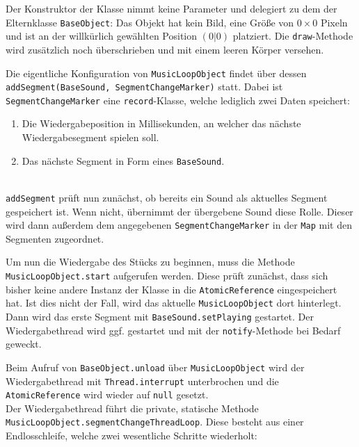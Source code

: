 \begin{sloppypar}
Der Konstruktor der Klasse nimmt keine Parameter und delegiert
zu dem der Elternklasse \texttt{BaseObject}: Das Objekt hat kein
Bild, eine Größe von $0 \times 0$ Pixeln und ist an der willkürlich
gewählten Position $(0|0)$ platziert. Die \texttt{draw}-Methode
wird zusätzlich noch überschrieben und mit einem leeren Körper
versehen.

Die eigentliche Konfiguration von \texttt{MusicLoopObject} findet
über dessen \texttt{addSegment(BaseSound, SegmentChangeMarker)}
statt. Dabei ist \texttt{SegmentChangeMarker} eine \texttt{record}-Klasse,
welche lediglich zwei Daten speichert:

\begin{enumerate}
	\item Die Wiedergabeposition in Millisekunden, an welcher das
	      nächste Wiedergabesegment spielen soll.
	\item Das nächste Segment in Form eines \texttt{BaseSound}.
\end{enumerate}
\\

\texttt{addSegment} prüft nun zunächst, ob bereits ein Sound als
aktuelles Segment gespeichert ist. Wenn nicht, übernimmt der
übergebene Sound diese Rolle. Dieser wird dann außerdem dem
angegebenen \texttt{SegmentChangeMarker} in der \texttt{Map}
mit den Segmenten zugeordnet.

Um nun die Wiedergabe des Stücks zu beginnen, muss die Methode
\texttt{MusicLoopObject.start} aufgerufen werden. Diese prüft
zunächst, dass sich bisher keine andere Instanz der Klasse in
die \texttt{AtomicReference} eingespeichert hat. Ist dies nicht
der Fall, wird das aktuelle \texttt{MusicLoopObject} dort hinterlegt.
Dann wird das erste Segment mit \texttt{BaseSound.setPlaying}
gestartet. Der Wiedergabethread wird ggf. gestartet und mit der
\texttt{notify}-Methode bei Bedarf geweckt.

Beim Aufruf von \texttt{BaseObject.unload} über \texttt{MusicLoopObject}
wird der Wiedergabethread mit \texttt{Thread.interrupt} unterbrochen
und die \texttt{AtomicReference} wird wieder auf \texttt{null}
gesetzt.
\\

Der Wiedergabethread führt die private, statische Methode
\texttt{MusicLoopObject.segmentChangeThreadLoop}. Diese
besteht aus einer Endlosschleife, welche zwei wesentliche
Schritte wiederholt:


\end{sloppypar}
